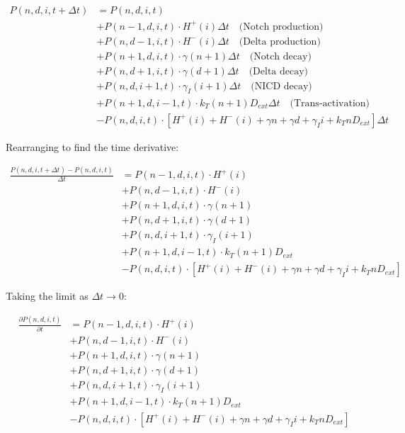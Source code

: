 \documentclass{article}
\begin{document}
\begin{flushleft}
\begin{align*}
P(n,d,i,t+\Delta t) &= P(n,d,i,t) \\
&+ P(n-1,d,i,t) \cdot H^+(i) \Delta t \quad \text{(Notch production)} \\
&+ P(n,d-1,i,t) \cdot H^-(i) \Delta t \quad \text{(Delta production)} \\
&+ P(n+1,d,i,t) \cdot \gamma(n+1)\Delta t \quad \text{(Notch decay)} \\
&+ P(n,d+1,i,t) \cdot \gamma(d+1)\Delta t \quad \text{(Delta decay)} \\
&+ P(n,d,i+1,t) \cdot \gamma_I(i+1)\Delta t \quad \text{(NICD decay)} \\
&+ P(n+1,d,i-1,t) \cdot k_T(n+1)D_{ext}\Delta t \quad \text{(Trans-activation)} \\
&- P(n,d,i,t) \cdot [H^+(i) + H^-(i) + \gamma n + \gamma d + \gamma_I i + k_T n D_{ext}]\Delta t
\end{align*}

Rearranging to find the time derivative:

\begin{align*}
\frac{P(n,d,i,t+\Delta t) - P(n,d,i,t)}{\Delta t} &= P(n-1,d,i,t) \cdot H^+(i) \\
&+ P(n,d-1,i,t) \cdot H^-(i) \\
&+ P(n+1,d,i,t) \cdot \gamma(n+1) \\
&+ P(n,d+1,i,t) \cdot \gamma(d+1) \\
&+ P(n,d,i+1,t) \cdot \gamma_I(i+1) \\
&+ P(n+1,d,i-1,t) \cdot k_T(n+1)D_{ext} \\
&- P(n,d,i,t) \cdot [H^+(i) + H^-(i) + \gamma n + \gamma d + \gamma_I i + k_T n D_{ext}]
\end{align*}

Taking the limit as $\Delta t \rightarrow 0$:

\begin{align*}
\frac{\partial P(n,d,i,t)}{\partial t} &= P(n-1,d,i,t) \cdot H^+(i) \\
&+ P(n,d-1,i,t) \cdot H^-(i) \\
&+ P(n+1,d,i,t) \cdot \gamma(n+1) \\
&+ P(n,d+1,i,t) \cdot \gamma(d+1) \\
&+ P(n,d,i+1,t) \cdot \gamma_I(i+1) \\
&+ P(n+1,d,i-1,t) \cdot k_T(n+1)D_{ext} \\
&- P(n,d,i,t) \cdot [H^+(i) + H^-(i) + \gamma n + \gamma d + \gamma_I i + k_T n D_{ext}]
\end{align*}


\end{flushleft}
\end{document}
